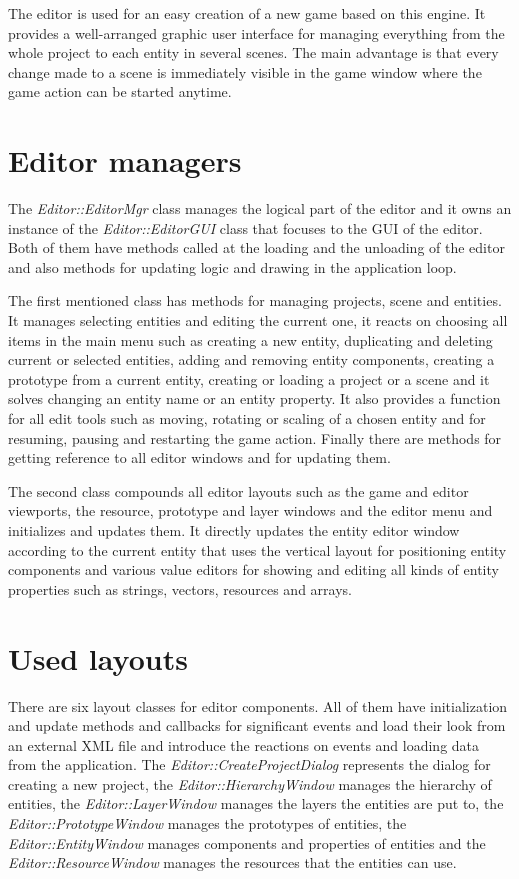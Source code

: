 \documentclass[a4paper, 12pt]{report}
\begin{document}
The editor is used for an easy creation of a new game based on this engine. It provides a well-arranged graphic user interface for managing everything from the whole project to each entity in several scenes. The main advantage is that every change made to a scene is immediately visible in the game window where the game action can be started anytime.

\section{Editor managers}

The \emph{Editor::EditorMgr} class manages the logical part of the editor and it owns an instance of the \emph{Editor::EditorGUI} class that focuses to the GUI of the editor. Both of them have methods called at the loading and the unloading of the editor and also methods for updating logic and drawing in the application loop.

The first mentioned class has methods for managing projects, scene and entities. It manages selecting entities and editing the current one, it reacts on choosing all items in the main menu such as creating a new entity, duplicating and deleting current or selected entities, adding and removing entity components, creating a prototype from a current entity, creating or loading a project or a scene and it solves changing an entity name or an entity property. It also provides a function for all edit tools such as moving, rotating or scaling of a chosen entity and for resuming, pausing and restarting the game action. Finally there are methods for getting reference to all editor windows and for updating them.

The second class compounds all editor layouts such as the game and editor viewports, the resource, prototype and layer windows and the editor menu and initializes and updates them. It directly updates the entity editor window according to the current entity that uses the vertical layout for positioning entity components and various value editors for showing and editing all kinds of entity properties such as strings, vectors, resources and arrays.

\section{Used layouts}

There are six layout classes for editor components. All of them have initialization and update methods and callbacks for significant events and load their look from an external XML file and introduce the reactions on events and loading data from the application. The \emph{Editor::Create\-Project\-Dialog} represents the dialog for creating a new project, the \emph{Editor\-::\-Hierarchy\-Window} manages the hierarchy of entities, the \emph{Editor\-::\-Layer\-Window} manages the layers the entities are put to, the \emph{Editor\-::\-Prototype\-Window} manages the prototypes of entities, the \emph{Editor\-::\-Entity\-Window} manages components and properties of entities and the \emph{Editor\-::\-Resource\-Window} manages the resources that the entities can use.
\end{document}
